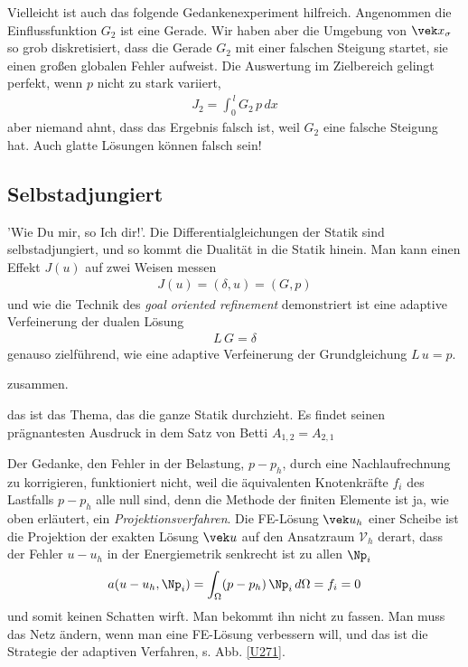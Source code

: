 {{{Vielleicht ist auch das folgende Gedankenexperiment hilfreich. Angenommen die Einflussfunktion $G_2$ ist eine Gerade. Wir haben aber die Umgebung von $\vek x_\sigma$ so grob diskretisiert, dass die Gerade $G_2$ mit einer falschen Steigung startet, sie einen gro{\ss}en globalen Fehler aufweist. Die Auswertung im Zielbereich gelingt perfekt, wenn $p$ nicht zu stark variiert,
\begin{align}
J_2 = \int_0^{\,l} G_2\,p\,dx
\end{align}
aber niemand ahnt, dass das Ergebnis falsch ist, weil $G_2$ eine falsche Steigung hat. Auch glatte L\"{o}sungen k\"{o}nnen falsch sein!\\

\textcolor{blau2}{\section{Selbstadjungiert}}
'Wie Du mir, so Ich dir!'. Die Differentialgleichungen der Statik sind selbstadjungiert, und
so kommt die Dualit\"{a}t in die Statik hinein. Man kann einen Effekt $J(u)$ auf zwei Weisen messen
\begin{align}
J(u) = (\delta, u) = (G, p)
\end{align}
und wie die Technik des {\em goal oriented refinement\/} demonstriert ist eine adaptive Verfeinerung der dualen L\"{o}sung
\begin{align}
L\,G = \delta
\end{align}
genauso zielf\"{u}hrend, wie eine adaptive Verfeinerung der Grundgleichung $L\,u = p$.

zusammen.

das ist das Thema, das die ganze Statik durchzieht. Es findet seinen pr\"{a}gnantesten Ausdruck in dem Satz von Betti $A_{1,2} = A_{2,1}$

\begin{remark}
 Der Gedanke, den Fehler in der Belastung, $p - p_h$, durch eine Nachlaufrechnung zu korrigieren, funktioniert nicht, weil die \"{a}quivalenten Knotenkr\"{a}fte $f_i$ des Lastfalls $p - p_h$ alle null sind, denn die Methode der finiten Elemente ist ja, wie oben erl\"{a}utert, ein {\em Projektionsverfahren\/}. Die FE-L\"{o}sung $\vek u_h$ einer Scheibe ist die Projektion der exakten L\"{o}sung $\vek u$ auf den Ansatzraum $\mathcal{V}_h$ derart, dass der Fehler $u- u_h$ in der Energiemetrik senkrecht ist zu allen $\Np_i$
\begin{align}
a(u -u_h, \Np_i) = \int_{\Omega} ( p - p_h) \,\Np_i\,d\Omega = f_i = 0
\end{align}
und somit keinen Schatten wirft. Man bekommt ihn nicht zu fassen. Man muss das Netz  \"{a}ndern, wenn man eine FE-L\"{o}sung verbessern will, und das ist die Strategie der adaptiven Verfahren, s. Abb. \ref{U271}.
\end{remark}

}}}
